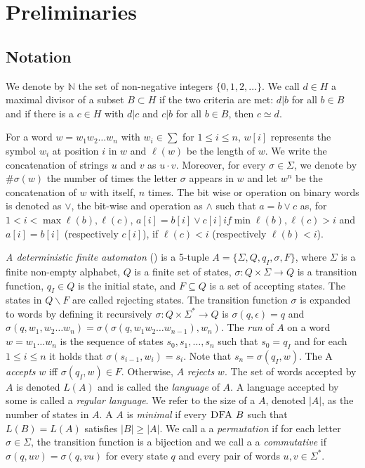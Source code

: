 \chapter{Preliminaries}
\label{ch:preliminaries}

\section{Notation}
\label{ch:prelimiaries:notation}
We denote by $\mathbb{N}$ the set of non-negative integers $\{0, 1, 2, \dots \}$.
We call $d \in H$ a maximal divisor of a subset $B \subset H$ if the two criteria are met: $d|b$ for all $b \in B$ and if there is a $c \in H$ with $d|c$ and $c|b$ for all $b \in B$, then $c \simeq d$.

For a word $w = w_1 w_2 \dots w_n$ with $w_i \in \sum$ for $1 \leq i \leq n$, $w[i]$ represents the symbol $w_i$ at position $i$ in $w$ and $\ell(w)$ be the length of $w$.
We write the concatenation of strings $u$ and $v$ as $u \cdot v$.
Moreover, for every $\sigma \in \Sigma$, we denote by $\#\sigma(w)$ the number of times the letter $\sigma$ appears in $w$ and let $w^n$ be the concatenation of $w$ with itself, $n$ times.
The bit wise or operation on binary words is denoted as $\lor$, the bit-wise and operation as $\land$ such that $a = b \vee c$ as, for $1 < i < \max{\ell(b), \ell(c)}$, $a[i] = b[i] \vee c[i] if \min{\ell(b), \ell(c)} > i$ and  $a[i] = b[i]$ (respectively $c[i]$), if $\ell(c) < i$ (respectively $\ell(b) < i$).

\textit{A deterministic finite automaton} (\DFA) is a 5-tuple $A = \lbrace\Sigma, Q, q_I , \sigma, F\rbrace$, where $\Sigma$ is a finite non-empty alphabet, $Q$ is a finite set of states, $\sigma : Q \times \Sigma \rightarrow Q$ is a transition function, $q_I \in Q$ is the initial state, and $F \subseteq Q$ is a set of accepting states.
The states in $Q \backslash F$ are called rejecting states.
The transition function $\sigma$ is expanded to words by defining it recursively $\sigma : Q \times \Sigma^* \rightarrow Q$ is $\sigma(q, \epsilon) = q$ and $\sigma(q, w_1, w_2 \dots w_n ) = \sigma(\sigma(q, w_1 w_2 \dots w_{n-1} ), w_n )$.
The \textit{run} of $A$ on a word $w = w_1 \dots w_n$ is the sequence of states $s_0 , s_1 , \dots , s_n$ such that $s_0 = q_I$ and for each $1 \leq i \leq n$ it holds that $\sigma(s_{i-1} , w_i ) = s_i$.
Note that $s_n = \sigma(q_I , w)$. The \DFA A \textit{accepts} $w$ iff $\sigma(q_I , w) \in F$. Otherwise, $A$ \textit{rejects} $w$.
The set of words accepted by $A$ is denoted $L(A)$ and is called the \textit{language} of $A$.
A language accepted by some \DFA is called a \textit{regular language}.
We refer to the size of a \DFA $A$, denoted $|A|$, as the number of states in $A$.
A \DFA $A$ is \textit{minimal} if every $\textsc{DFA}~B$ such that $L(B) = L(A)$ satisfies $|B| \geq |A|$.
We call a \DFA a \textit{permutation \DFA} if for each letter $\sigma \in \Sigma$, the transition function is a bijection and we call a \DFA a \textit{commutative \DFA} if $\sigma(q, uv) = \sigma(q, vu)$ for every state $q$ and every pair of words $u, v \in \Sigma^*$.

